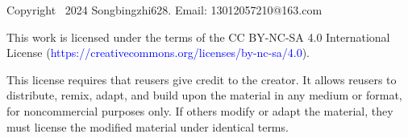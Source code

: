 
\def\allfiles{}









Copyright \textcopyright\ 2024 Songbingzhi628. \;Email: 13012057210@163.com\par
\scriptsize
This work is licensed under the terms of the CC BY-NC-SA 4.0 International License (\textcolor{blue}{https://creativecommons.org/licenses/by-nc-sa/4.0}).\par
This license requires that reusers give credit to the creator. It allows reusers to distribute, remix, adapt, and build upon the material in any medium or format, for noncommercial purposes only. If others modify or adapt the material, they must license the modified material under identical terms.
\SepLine[10pt]

